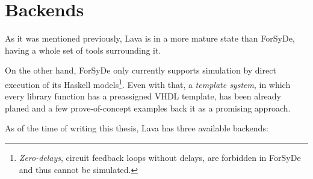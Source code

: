 \section{Backends}
As it was mentioned previously, Lava is in a more mature state than
ForSyDe, having a whole set of tools surrounding it.

On the other hand, ForSyDe only currently supports simulation by
direct execution of its Haskell models\footnote{\textit{Zero-delays},
  circuit feedback loops without delays, are forbidden in ForSyDe and
  thus cannot be simulated.}. Even with that, a \textit{template
  system}, in which every library function has a preassigned VHDL
template, has been already planed and a few prove-of-concept
examples \cite[Chapter 6]{forsyde:thesis} back it as a promising
approach.

As of the time of writing this thesis, Lava has three available backends:

